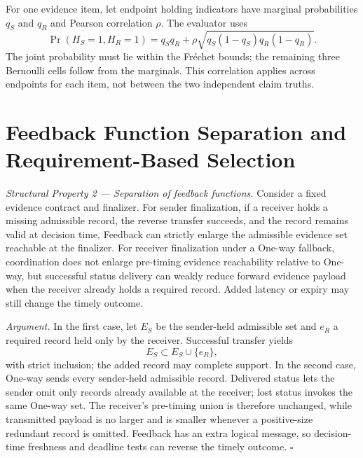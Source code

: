 For one evidence item, let endpoint holding indicators have marginal
probabilities $q_S$ and $q_R$ and Pearson correlation $\rho$. The evaluator
uses
\begin{equation}
\Pr(H_S=1,H_R=1)=q_Sq_R+
\rho\sqrt{q_S(1-q_S)q_R(1-q_R)}.
\end{equation}
The joint probability must lie within the Fr\'echet bounds; the remaining three
Bernoulli cells follow from the marginals. This correlation applies across
endpoints for each item, not between the two independent claim truths.

\section{Feedback Function Separation and Requirement-Based Selection}

\emph{Structural Property 2 --- Separation of feedback functions.} Consider a fixed evidence
contract and finalizer. For sender finalization, if a receiver holds a missing
admissible record, the reverse transfer succeeds, and the record remains valid
at decision time, Feedback can strictly enlarge the admissible evidence set
reachable at the finalizer. For receiver finalization under a One-way fallback,
coordination does not enlarge pre-timing evidence reachability relative to
One-way, but successful status delivery can weakly reduce forward evidence
payload when the receiver already holds a required record. Added latency or
expiry may still change the timely outcome.

\emph{Argument.} In the first case, let $E_S$ be the sender-held admissible set and
$e_R$ a required record held only by the receiver. Successful transfer yields
\begin{equation}
E_S\subset E_S\cup\{e_R\},
\end{equation}
with strict inclusion; the added record may complete support. In the second
case, One-way sends every sender-held admissible record. Delivered status lets
the sender omit only records already available at the receiver; lost status
invokes the same One-way set. The receiver's pre-timing union is therefore
unchanged, while transmitted payload is no larger and is smaller whenever a
positive-size redundant record is omitted. Feedback has an extra logical
message, so decision-time freshness and deadline tests can reverse the timely
outcome. \hfill$\square$

